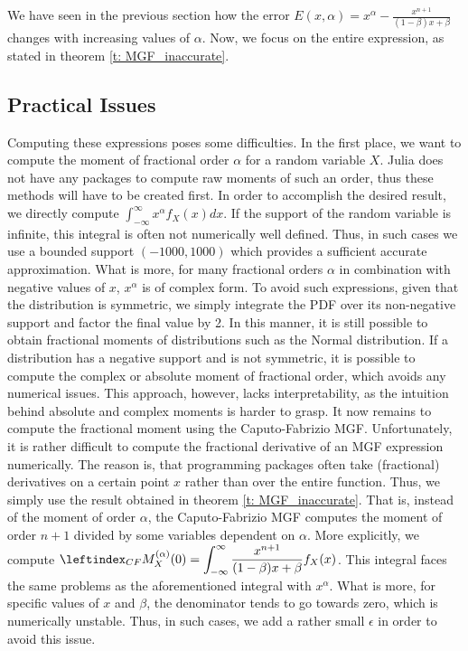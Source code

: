 We have seen in the previous section how the error \(E(x, \alpha) = x^\alpha - \displaystyle \frac{x^{n+1} }{(1 - \beta)x + \beta}\) changes with increasing values of \(\alpha\). Now, we focus on the entire expression, as stated in theorem \ref{t: MGF_inaccurate}.
\subsection{Practical Issues}
Computing these expressions poses some difficulties. In the first place, we want to compute the moment of fractional order \(\alpha\) for a random variable \(X\). Julia does not have any packages to compute raw moments of such an order, thus these methods will have to be created first. In order to accomplish the desired result, we directly compute \(\int_{-\infty}^{\infty} x^\alpha  f_X(x) dx\). If the support of the random variable is infinite, this integral is often not numerically well defined. Thus, in such cases we use a bounded support \((-1000, 1000)\) which provides a sufficient accurate approximation. What is more, for many fractional orders \(\alpha\) in combination with negative values of \(x\), \(x^\alpha\) is of complex form. To avoid such expressions, given that the distribution is symmetric, we simply integrate the PDF over its non-negative support and factor the final value by 2. In this manner, it is still possible to obtain fractional moments of distributions such as the Normal distribution. If a distribution has a negative support and is not symmetric, it is possible to compute the complex or absolute moment of fractional order, which avoids any numerical issues. This approach, however, lacks interpretability, as the intuition behind absolute and complex moments is harder to grasp. 
\newline
It now remains to compute the fractional moment using the Caputo-Fabrizio MGF. Unfortunately, it is rather difficult to compute the fractional derivative of an MGF expression numerically. The reason is, that programming packages often take (fractional) derivatives on a certain point \(x\) rather than over the entire function. Thus, we simply use the result obtained in theorem \ref{t: MGF_inaccurate}. That is, instead of the moment of order \(\alpha\), the Caputo-Fabrizio MGF computes the moment of order \(n+1\) divided by some variables dependent on \(\alpha\). More explicitly, we compute \(\leftindex_{CF}{M}_X^{(\alpha)}(0) = \displaystyle \int_{-\infty}^{\infty}  \frac{x^{n+1} }{(1 - \beta)x + \beta} f_X(x)\). This integral faces the same problems as the aforementioned integral with \(x^\alpha\). What is more, for specific values of \(x\) and \(\beta\), the denominator tends to go towards zero, which is numerically unstable. Thus, in such cases, we add a rather small \(\epsilon\) in order to avoid this issue.

